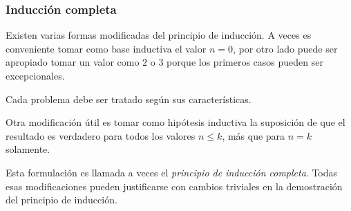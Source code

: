 \documentclass{beamer}
\begin{document}
\begin{frame}
    \frametitle{Inducción completa}
    Existen varias formas modificadas del principio de inducción. A veces es conveniente tomar como base inductiva el valor $n=0$, por otro lado puede ser apropiado tomar un valor como $2$ o $3$ porque los primeros casos pueden ser excepcionales. 
    \pause
    \medskip
    
    Cada problema debe ser tratado según sus características. 
    \pause
    \medskip
    
    Otra modificación útil es tomar como hipótesis inductiva la suposición de que el resultado es verdadero para todos los valores $n\le k$, más que para $n=k$ solamente.
    \pause
    \medskip
    
    Esta formulación es llamada a veces el {\it principio de inducción completa}. Todas esas modificaciones pueden justificarse con cambios triviales en la demostración del principio de inducción.
    
\end{frame}

\end{document}
